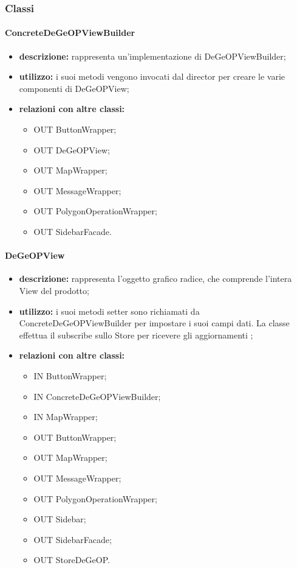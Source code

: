 \subsubsection{Classi}
\paragraph{ConcreteDeGeOPViewBuilder}
\begin{itemize}
	\item \textbf{descrizione:} rappresenta un'implementazione di DeGeOPViewBuilder;
	\item \textbf{utilizzo:} i suoi metodi vengono invocati dal director per creare le varie componenti di DeGeOPView;
	\item \textbf{relazioni con altre classi:} 
	\begin{itemize}
		\item OUT ButtonWrapper;
		\item OUT DeGeOPView;
		\item OUT MapWrapper;
		\item OUT MessageWrapper;
		\item OUT PolygonOperationWrapper;
		\item OUT SidebarFacade.
	\end{itemize}
\end{itemize}
\paragraph{DeGeOPView}
\begin{itemize}
	\item \textbf{descrizione:} rappresenta l'oggetto grafico radice, che comprende l'intera View del prodotto;
	\item \textbf{utilizzo:} i suoi metodi setter sono richiamati da ConcreteDeGeOPViewBuilder per impostare i suoi campi dati. La classe effettua il subscribe sullo Store per ricevere gli aggiornamenti ;
	\item \textbf{relazioni con altre classi:} 
	\begin{itemize}
		\item IN ButtonWrapper;
		\item IN ConcreteDeGeOPViewBuilder;
		\item IN MapWrapper;
		\item OUT ButtonWrapper;
		\item OUT MapWrapper;
		\item OUT MessageWrapper;
		\item OUT PolygonOperationWrapper;
		\item OUT Sidebar;
		\item OUT SidebarFacade;
		\item OUT StoreDeGeOP.
	\end{itemize}
\end{itemize}
